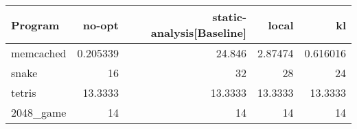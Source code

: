 \begin{tabular}{lrrrr}
\hline
 Program   &    no-opt &   static-analysis[Baseline] &    local &        kl \\
\hline
 memcached &  0.205339 &                     24.846  &  2.87474 &  0.616016 \\
 snake     & 16        &                     32      & 28       & 24        \\
 tetris    & 13.3333   &                     13.3333 & 13.3333  & 13.3333   \\
 2048\_game & 14        &                     14      & 14       & 14        \\
\hline
\end{tabular}